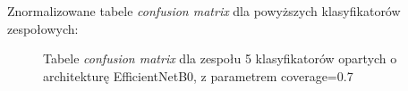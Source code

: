 \documentclass[polish,12pt]{aghthesis}
\begin{document}
\newpage
\noindent Znormalizowane tabele \textit{confusion matrix} dla powyższych klasyfikatorów zespołowych:
\begin{figure}[h!]%
    \begin{adjustbox}{minipage=1.0\paperwidth, pagecenter}
    \centering
    \qquad
    \end{adjustbox}
     \label{fig:eff-ens-5-0.7-matrices}
    \caption{Tabele \textit{confusion matrix} dla zespołu 5 klasyfikatorów opartych o architekturę EfficientNetB0, z parametrem coverage=0.7}
\end{figure}
\end{document}
